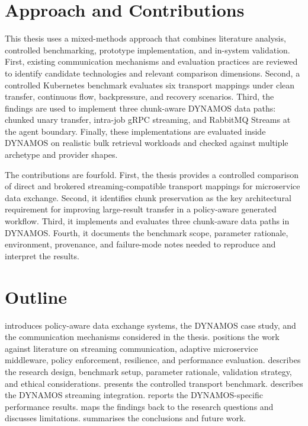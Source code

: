 \section{Approach and Contributions}

This thesis uses a mixed-methods approach that combines literature analysis, controlled benchmarking, prototype implementation, and in-system validation. First, existing communication mechanisms and evaluation practices are reviewed to identify candidate technologies and relevant comparison dimensions. Second, a controlled Kubernetes benchmark evaluates six transport mappings under clean transfer, continuous flow, backpressure, and recovery scenarios. Third, the findings are used to implement three chunk-aware DYNAMOS data paths: chunked unary transfer, intra-job gRPC streaming, and RabbitMQ Streams at the agent boundary. Finally, these implementations are evaluated inside DYNAMOS on realistic bulk retrieval workloads and checked against multiple archetype and provider shapes.

The contributions are fourfold. First, the thesis provides a controlled comparison of direct and brokered streaming-compatible transport mappings for microservice data exchange. Second, it identifies chunk preservation as the key architectural requirement for improving large-result transfer in a policy-aware generated workflow. Third, it implements and evaluates three chunk-aware data paths in DYNAMOS. Fourth, it documents the benchmark scope, parameter rationale, environment, provenance, and failure-mode notes needed to reproduce and interpret the results.

\section{Outline}

 introduces policy-aware data exchange systems, the DYNAMOS case study, and the communication mechanisms considered in the thesis.  positions the work against literature on streaming communication, adaptive microservice middleware, policy enforcement, resilience, and performance evaluation.  describes the research design, benchmark setup, parameter rationale, validation strategy, and ethical considerations.  presents the controlled transport benchmark.  describes the DYNAMOS streaming integration.  reports the DYNAMOS-specific performance results.  maps the findings back to the research questions and discusses limitations.  summarises the conclusions and future work.
